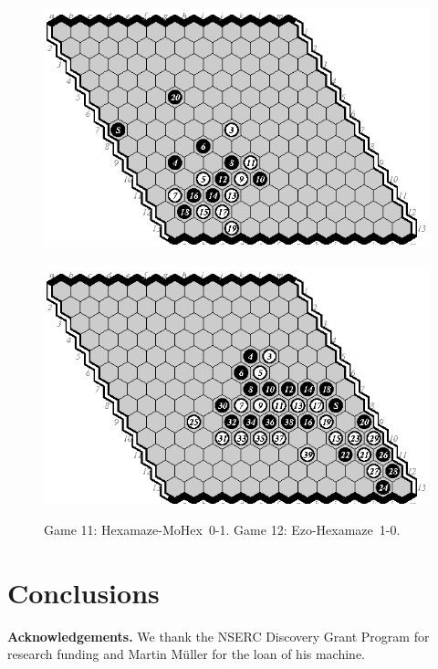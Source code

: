 \documentclass{icga}
\def\Eo{\mbox{\sc Ezo}}
\def\Hz{\mbox{\sc Hexamaze}}
\def\Mx{\mbox{\sc MoHex}}
\begin{document}
\begin{figure}[hbp]
\includegraphics[scale=1.2]{games/pix/13-11-hm-0-1.eps}\hspace*{-1cm}\
\includegraphics[scale=1.2]{games/pix/13-12-eh-1-0.eps}
\caption{Game 11: \Hz-\Mx\ 0-1. Game 12: \Eo-\Hz\ 1-0.}
\end{figure}

\section{Conclusions}


{\bf Acknowledgements.}
We thank the NSERC Discovery Grant Program for research funding and
Martin M\"{u}ller for the loan of his machine.

\end{document}
